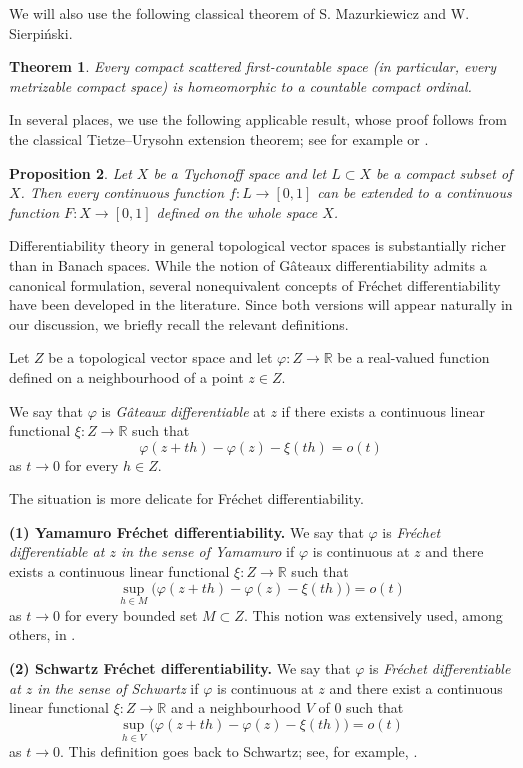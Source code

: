 \documentclass[12pt]{amsart}
\theoremstyle{plain}
\newtheorem{theorem}{Theorem}[section]
\newtheorem{proposition}[theorem]{Proposition}
\theoremstyle{definition}
\theoremstyle{remark}
\def\vv{\varphi}
\begin{document}
We will also use the following classical theorem of S. Mazurkiewicz and W. Sierpi\'nski.

\begin{theorem}\cite[Theorem 8.6.10]{Semadeni}\label{ordinal}
Every compact scattered first-countable space (in particular, every metrizable compact space) is homeomorphic to a countable compact ordinal.
\end{theorem}

In several places, we  use the following applicable result,  whose proof follows from the classical Tietze--Urysohn extension theorem;
see for example \cite[Extension Lemma, p. 29]{Jarchow} or \cite[Section 3.6]{e}.
\begin{proposition}\label{T}
Let $X$ be a  Tychonoff space and let $L\subset X$ be a compact subset of $X$. Then every continuous function $f: L\rightarrow [0,1]$ can  be extended to a continuous function $F:X\rightarrow [0,1]$  defined on the whole space $X$.
\end{proposition}
Differentiability theory in general topological vector spaces is substantially richer than in Banach spaces. While the notion of G\^ateaux differentiability admits a canonical formulation, several nonequivalent concepts of Fr\'echet differentiability have been developed in the literature. Since both versions will appear naturally in our discussion, we briefly recall the relevant definitions.

Let $Z$ be a topological vector space and let $\vv:Z\to\mathbb{R}$ be a real-valued function defined on a neighbourhood of a point $z\in Z$.

We say that $\vv$ is \emph{G\^ateaux differentiable} at $z$ if there exists a continuous linear functional $\xi:Z\to\mathbb R$ such that
\[
\vv(z+th)-\vv(z)-\xi(th)=o(t)
\]
as $t\to0$ for every $h\in Z$.

The situation is more delicate for Fr\'echet differentiability.

\medskip

\noindent
{\bf (1) Yamamuro Fr\'echet differentiability.}
We say that $\vv$ is \emph{Fr\'echet differentiable at $z$ in the sense of Yamamuro} if $\vv$ is continuous at $z$ and there exists a continuous linear functional $\xi:Z\to\mathbb R$ such that
\[
\sup_{h\in M}
\bigl(\vv(z+th)-\vv(z)-\xi(th)\bigr)=o(t)
\]
as $t\to0$ for every bounded set $M\subset Z$.
This notion was extensively used, among others, in \cite{s,y}.

\medskip

\noindent
{\bf (2) Schwartz Fr\'echet differentiability.}
We say that $\vv$ is \emph{Fr\'echet differentiable at $z$ in the sense of Schwartz} if $\vv$ is continuous at $z$ and there exist a continuous linear functional $\xi:Z\to\mathbb R$ and a neighbourhood $V$ of $0$ such that
\[
\sup_{h\in V}
\bigl(\vv(z+th)-\vv(z)-\xi(th)\bigr)=o(t)
\]
as $t\to0$.
This definition goes back to Schwartz; see, for example, \cite[p.~11]{sc}.
\end{document}
